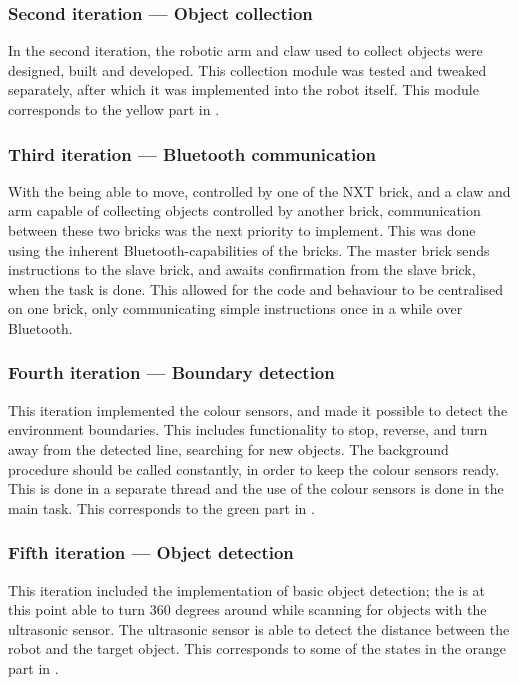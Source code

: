 \subsubsection{Second iteration --- Object collection}
In the second iteration, the robotic arm and claw used to collect objects were designed, built and developed. This collection module was tested and tweaked separately, after which it was implemented into the robot itself. This module corresponds to the yellow part in .


\subsubsection{Third iteration --- Bluetooth communication}
With the \projname{} being able to move, controlled by one of the NXT brick, and a claw and arm capable of collecting objects controlled by another brick, communication between these two bricks was the next priority to implement. This was done using the inherent Bluetooth-capabilities of the bricks. The master brick sends instructions to the slave brick, and awaits confirmation from the slave brick, when the task is done. This allowed for the code and behaviour to be centralised on one brick, only communicating simple instructions once in a while over Bluetooth.


\subsubsection{Fourth iteration --- Boundary detection}
This iteration implemented the colour sensors, and made it possible to detect the environment boundaries. This includes functionality to stop, reverse, and turn away from the detected line, searching for new objects. The background procedure should be called constantly, in order to keep the colour sensors ready. This is done in a separate thread and the use of the colour sensors is done in the main task. This corresponds to the green part in . 


\subsubsection{Fifth iteration --- Object detection}
This iteration included the implementation of basic object detection; the \projname{} is at this point able to turn 360 degrees around while scanning for objects with the ultrasonic sensor. The ultrasonic sensor is able to detect the distance between the robot and the target object. This corresponds to some of the states in the orange part in .



